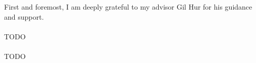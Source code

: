 \acknowledgement
First and foremost, I am deeply grateful to my advisor Gil Hur for his guidance and support.
\paragraph*{}
TODO
\paragraph*{}
TODO
